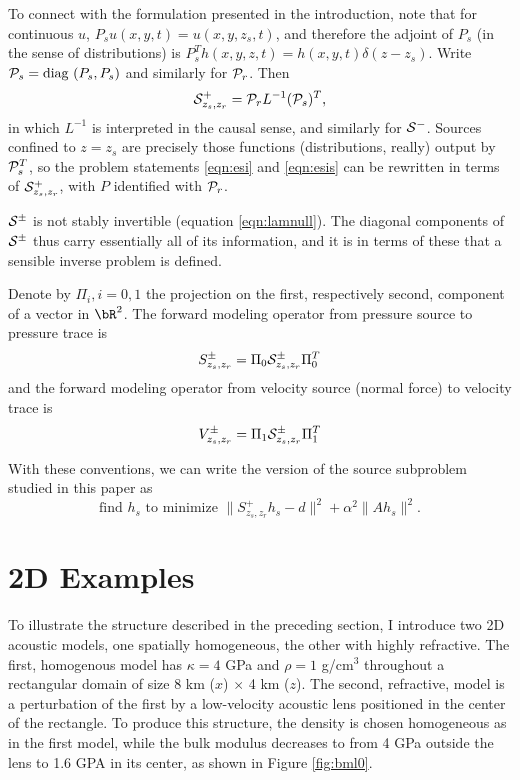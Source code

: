  To connect with the formulation presented in
the introduction, note that for continuous $u$,
$P_su(x,y,t)=u(x,y,z_s,t)$, and therefore the adjoint of $P_s$ (in the
sense of distributions) is $P_s^Th(x,y,z,t) =
h(x,y,t)\delta(z-z_s)$. Write ${\cal P}_s = \mbox{diag }(P_s,P_s)$ and
similarly for ${\cal P}_r$. Then
\[
  {\cal S}^{+}_{z_s,z_r} = {\cal P}_r L^{-1}({\cal P}_s)^T,
\]
in which $L^{-1}$ is interpreted in the causal sense, and similarly
for ${\cal S}^{-}$. Sources confined to $z=z_s$ are precisely those
functions (distributions, really) output by ${\cal P}_s^T$, so the
problem statements \ref{eqn:esi} and \ref{eqn:esis} can be rewritten
in terms of ${\cal S}^+_{z_s,z_r}$, with $P$ identified with ${\cal P}_r$.

${\cal S}^{\pm}$ is not stably invertible (equation \ref{eqn:lamnull}). The
diagonal components of ${\cal S}^{\pm}$ thus carry essentially all of
its information, and it is in terms of these that a sensible inverse problem
is defined.

Denote by $\Pi_i, i=0,1$ the projection on the first,
respectively second, component of a vector in $\bR^2$. The 
forward modeling operator from pressure source to pressure trace is
\begin{equation}
  \label{eqn:sdef}
  S^{\pm}_{z_s,z_r} = \Pi_0 {\cal S}^{\pm}_{z_s,z_r} \Pi_0^T 
\end{equation}
and the forward modeling operator from velocity source (normal force)
to velocity trace is
\begin{equation}
  \label{eqn:vdef}
  V^{\pm}_{z_s,z_r} = \Pi_1 {\cal S}^{\pm}_{z_s,z_r} \Pi_1^T 
\end{equation}

With these conventions, we can write the version of the source
subproblem studied in this paper as
\begin{equation}
  \label{eqn:esisp}
  \mbox{find }h_s\mbox{ to minimize }\|S^{+}_{z_s,z_r}h_s- d\|^2 +
  \alpha^2\|Ah_s\|^2.
\end{equation}

\section{2D Examples}


To illustrate the structure described in the preceding section, I
introduce two 2D acoustic models, one spatially homogeneous, the other
with highly refractive. The first, homogenous model has $\kappa = 4$
GPa and $\rho = 1$ g/cm$^3$ throughout a rectangular domain of size 8 km ($x$) $\times$ 4 km
($z$). The second, refractive, model is a perturbation of the first by
a low-velocity acoustic lens positioned in the center of the
rectangle. To produce this structure, the density is chosen
homogeneous as in the first model, while the bulk modulus decreases to
from 4 GPa outside the lens to 1.6 GPA in its center, as shown in Figure \ref{fig:bml0}.

